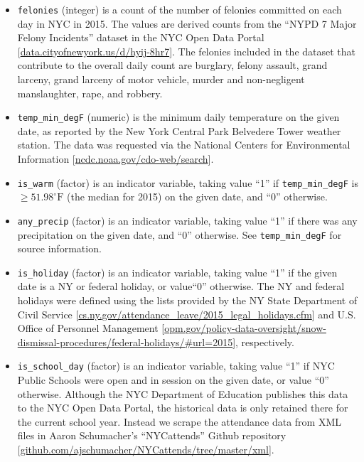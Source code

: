 \documentclass[11pt,notitlepage]{article}
\newcommand{\degf}{^\circ\text{F}}
\begin{document}
\begin{itemize}
\item \texttt{felonies} (integer) is a count of the number of felonies committed on each day in NYC in 2015. The values are derived counts from the ``NYPD 7 Major Felony Incidents'' dataset in the NYC Open Data Portal [\href{https://data.cityofnewyork.us/Public-Safety/NYPD-7-Major-Felony-Incidents/hyij-8hr7}{data.cityofnewyork.us/d/hyij-8hr7}]. The felonies included in the dataset that contribute to the overall daily count are burglary, felony assault, grand larceny, grand larceny of motor vehicle, murder and non-negligent manslaughter, rape, and robbery.

\item \texttt{temp_min_degF} (numeric) is the minimum daily temperature on the given date, as reported by the New York Central Park Belvedere Tower weather station. The data was requested via the National Centers for Environmental Information [\href{http://www.ncdc.noaa.gov/cdo-web/search}{ncdc.noaa.gov/cdo-web/search}].

\item \texttt{is_warm} (factor) is an indicator variable, taking value ``1'' if \texttt{temp_min_degF} is $\geq 51.98 \degf$ (the median for 2015) on the given date, and ``0'' otherwise.

\item \texttt{any_precip} (factor) is an indicator variable, taking value ``1'' if there was any precipitation on the given date, and ``0'' otherwise. See \texttt{temp_min_degF} for source information.


\item \texttt{is_holiday} (factor) is an indicator variable, taking value ``1'' if the given date is a NY or federal holiday, or value``0'' otherwise. The NY and federal holidays were defined using the lists provided by the NY State Department of Civil Service [\href{https://www.cs.ny.gov/attendance_leave/2015_legal_holidays.cfm}{cs.ny.gov/attendance_leave/2015_legal_holidays.cfm}] and U.S. Office of Personnel Management [\href{https://www.opm.gov/policy-data-oversight/snow-dismissal-procedures/federal-holidays/\#url=2015}{opm.gov/policy-data-oversight/snow-dismissal-procedures/federal-holidays/\#url=2015}], respectively.


\item \texttt{is_school_day} (factor) is an indicator variable, taking value ``1'' if NYC Public Schools were open and in session on the given date, or value ``0'' otherwise. Although the NYC Department of Education publishes this data to the NYC Open Data Portal, the historical data is only retained there for the current school year. Instead we scrape the attendance data from XML files in Aaron Schumacher's ``NYCattends'' Github repository [\href{https://github.com/ajschumacher/NYCattends/tree/master/xml}{github.com/ajschumacher/NYCattends/tree/master/xml}].



\end{itemize}
\end{document}
